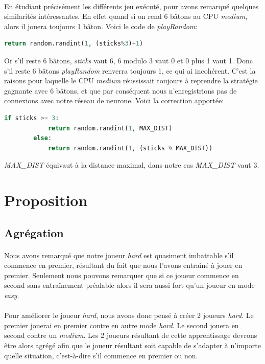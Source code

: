 \documentclass{article}
\begin{document}
  \paragraph{}
    En étudiant précisément les différents jeu exécuté, pour avons remarqué quelques similarités intéressantes. En effet quand si on rend 6 bâtons au CPU \emph{medium},
    alors il jouera toujours 1 bâton. Voici le code de \emph{playRandom}:
    \begin{lstlisting}[language=python]
    	return random.randint(1, (sticks%3)+1)
    \end{lstlisting}
    Or s'il reste 6 bâtons, \emph{sticks} vaut 6, 6 modulo 3 vaut 0 et 0 plus 1 vaut 1. Donc s'il reste 6 bâtons \emph{playRandom} renverra toujours 1, ce qui ai incohérent.
    C'est la raisons pour laquelle le CPU \emph{medium} réussissait toujours à reprendre la stratégie gagnante avec 6 bâtons, et que par conséquent nous n'enregistrions pas de connexions
    avec notre réseau de neurone.
    Voici la correction apportée:
    \begin{lstlisting}[language=python]
    	if sticks >= 3:
            return random.randint(1, MAX_DIST)
        else:
            return random.randint(1, (sticks % MAX_DIST))
    \end{lstlisting}
    \emph{MAX\_DIST} équivaut à la distance maximal, dans notre cas \emph{MAX\_DIST} vaut 3.
\newpage

\section{Proposition}
  \subsection{Agrégation}
  \paragraph{} 
    Nous avons remarqué que notre joueur \emph{hard} est quasiment imbattable s'il commence en premier,
    résultant du fait que nous l'avons entraîné à jouer en premier. Seulement nous pouvons remarquer que si ce joueur commence 
    en second sans entraînement préalable alors il sera aussi fort qu'un joueur en mode \emph{easy}.
  \paragraph{}
    Pour améliorer le joueur \emph{hard}, nous avons donc pensé à créer 2 joueurs \emph{hard}. Le premier jouerai en premier contre en autre
    mode \emph{hard}. Le second jouera en second contre un \emph{medium}. Les 2 joueurs résultant de cette apprentissage devrons être alors 
    agrégé afin que le joueur résultant soit capable de s'adapter à n'importe quelle situation, c'est-à-dire s'il commence en premier ou non.
\end{document}
